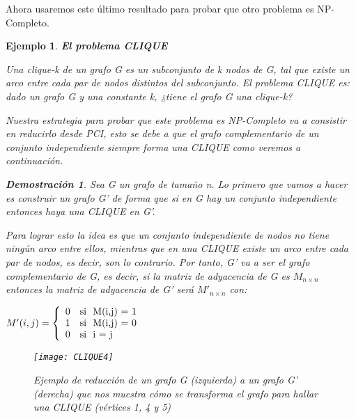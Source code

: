 \documentclass[a4paper,12pt,titlepage]{article}
\newtheorem{eje}{Ejemplo}[section]
\newtheorem*{dem}{\textbf{Demostraci\'on}}
\begin{document}
Ahora usaremos este \'ultimo resultado para probar que otro problema es NP-Completo.

\begin{eje}
\textbf{El problema CLIQUE}
\vspace{\baselineskip}

Una clique-k de un grafo G es un subconjunto de k nodos de G, tal que existe un arco entre cada par de nodos distintos del subconjunto. El problema CLIQUE es: dado un grafo G y una constante k, ¿tiene el grafo G una clique-k?

Nuestra estrategia para probar que este problema es NP-Completo va a consistir en reducirlo desde PCI, esto se debe a que el grafo complementario de un conjunto independiente siempre forma una CLIQUE como veremos a continuaci\'on.

\begin{dem}

Sea G un grafo de tamaño n. Lo primero que vamos a hacer es construir un grafo G' de forma que si en G hay un conjunto independiente entonces haya una CLIQUE en G'.

Para lograr esto la idea es que un conjunto independiente de nodos no tiene ning\'un arco entre ellos, mientras que en una CLIQUE existe un arco entre cada par de nodos, es decir, son lo contrario. Por tanto, G' va a ser el grafo complementario de G, es decir, si la matriz de adyacencia de G es $M_{n\times n}$ entonces la matriz de adyacencia de G' ser\'a $M'_{n\times n}$ con:

\vspace{\baselineskip}

\begin{center}

$ M'(i,j) = \left \lbrace
\begin{array}{l l}
0 & \mbox{si }\mbox{ M(i,j) = 1} \\
1 & \mbox{si }\mbox{ M(i,j) = 0} \\
0 & \mbox{si }\mbox{ i = j}
\end{array}
\right. $

\end{center}

\begin{figure}[h]
\centering
\texttt{[image: CLIQUE4]}
\caption{Ejemplo de reducción de un grafo G (izquierda) a un grafo G' (derecha) que nos muestra c\'omo se transforma el grafo para hallar una CLIQUE (vértices 1, 4 y 5)}
\label{CLIQUE}
\end{figure}


\end{dem}
\end{eje}
\end{document}
